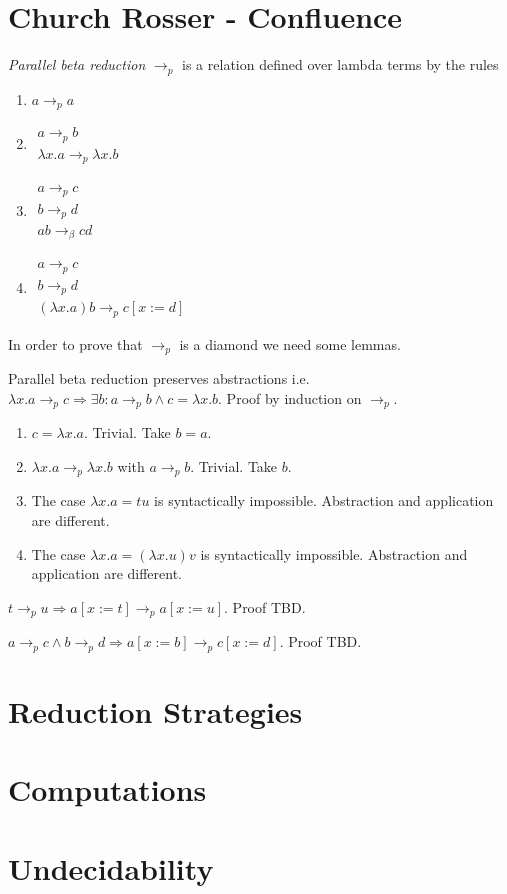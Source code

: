 \documentclass{article}
\def\imp{\Rightarrow}
\newcommand{\tobeta}{\to_\beta}
\newcommand{\tobetap}{\to_{p}}
\newcommand{\rulev}[2]{\begin{array}{l} #1 \\ \hline #2\end{array}}
\begin{document}
\section{Church Rosser - Confluence}

\begin{definition} \emph{Parallel beta reduction} $\tobetap$ is a relation
  defined over lambda terms by the rules
  \begin{enumerate}
  \item $a \tobetap a$
  \item $\rulev{a \tobetap b} {\lambda x.a \tobetap \lambda x.b}$
  \item $\rulev{a\tobetap c \\ b \tobetap d}{a b \tobeta c d}$
  \item $\rulev{a\tobetap c \\ b \tobetap d}{(\lambda x.a) b \tobetap c[x := d]}$
  \end{enumerate}
\end{definition}

In order to prove that $\tobetap$ is a diamond we need some lemmas.

\begin{lemma}
  Parallel beta reduction preserves abstractions i.e.
  $\lambda x.a \tobetap c \imp \exists b : a \tobetap b \land c = \lambda
  x.b$. Proof by induction on $\tobetap$.
  \begin{enumerate}
  \item $c = \lambda x.a$. Trivial. Take $b = a$.
  \item $\lambda x.a \tobetap \lambda x.b$ with $a \tobetap b$. Trivial. Take $b$.
  \item The case $\lambda x.a = t u$ is syntactically impossible. Abstraction
    and application are different.
  \item The case $\lambda x.a = (\lambda x.u) v$ is syntactically
    impossible. Abstraction and application are different.
  \end{enumerate}
\end{lemma}


\begin{lemma}
  $t \tobetap u \imp a[x := t] \tobetap a[x := u]$. Proof TBD.
\end{lemma}

\begin{lemma}
  $a \tobetap c \land b \tobetap d  \imp a[x := b] \tobetap c[x := d]$. Proof TBD.
\end{lemma}


\section{Reduction Strategies}

\section{Computations}

\section{Undecidability}



\end{document}
